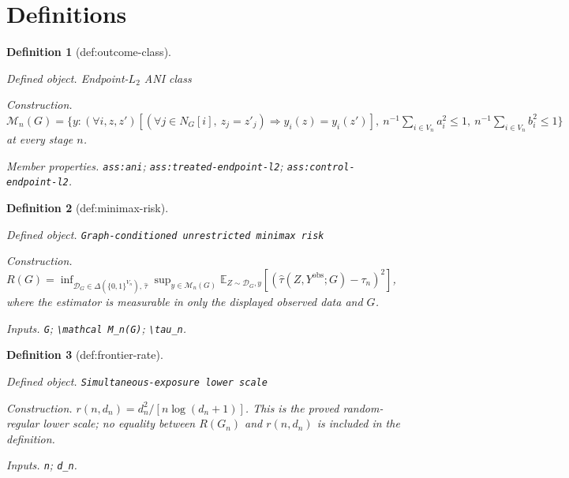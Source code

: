 \documentclass{article}
\newtheorem{definition}{Definition}
\begin{document}
\section{Definitions}

\begin{definition}[def:outcome-class]\label{def:outcome-class}
\par\smallskip\noindent\emph{Defined object.} Endpoint-\(L_2\) ANI class
\par\smallskip\noindent\emph{Construction.} \(\mathcal M_n(G)=\{y:(\forall i,z,z')[(\forall j\in N_G[i],\ z_j=z'_j)\Rightarrow y_i(z)=y_i(z')],\ n^{-1}\sum_{i\in V_n}a_i^2\le1,\ n^{-1}\sum_{i\in V_n}b_i^2\le1\}\) at every stage \(n\).
\par\smallskip\noindent\emph{Member properties.} \texttt{ass:\allowbreak{}ani}; \texttt{ass:\allowbreak{}treated-\allowbreak{}endpoint-\allowbreak{}l2}; \texttt{ass:\allowbreak{}control-\allowbreak{}endpoint-\allowbreak{}l2}.
\end{definition}

\begin{definition}[def:minimax-risk]\label{def:minimax-risk}
\par\smallskip\noindent\emph{Defined object.} \texttt{Graph-\allowbreak{}conditioned unrestricted minimax risk}
\par\smallskip\noindent\emph{Construction.} \(R(G)=\inf_{\mathcal D_G\in\Delta(\{0,1\}^{V_n}),\,\widehat\tau}\sup_{y\in\mathcal M_n(G)}\mathbb E_{Z\sim\mathcal D_G,y}[(\widehat\tau(Z,Y^{\mathrm{obs}};G)-\tau_n)^2]\), where the estimator is measurable in only the displayed observed data and \(G\).
\par\smallskip\noindent\emph{Inputs.} \texttt{G}; \texttt{\textbackslash{}\allowbreak{}mathcal M\_\allowbreak{}n(G)}; \texttt{\textbackslash{}\allowbreak{}tau\_\allowbreak{}n}.
\end{definition}

\begin{definition}[def:frontier-rate]\label{def:frontier-rate}
\par\smallskip\noindent\emph{Defined object.} \texttt{Simultaneous-\allowbreak{}exposure lower scale}
\par\smallskip\noindent\emph{Construction.} \(r(n,d_n)=d_n^2/[n\log(d_n+1)]\).  This is the proved random-regular lower scale; no equality between \(R(G_n)\) and \(r(n,d_n)\) is included in the definition.
\par\smallskip\noindent\emph{Inputs.} \texttt{n}; \texttt{d\_\allowbreak{}n}.
\end{definition}
\end{document}
